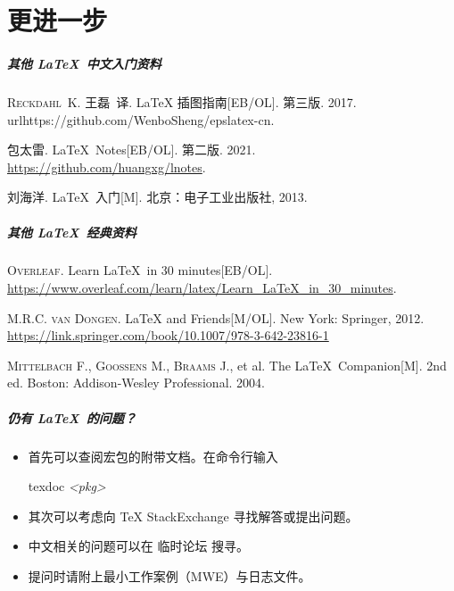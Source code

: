 
\part{更进一步}

\begin{frame}
  \frametitle{其他 \LaTeX\ 中文入门资料}
  \begin{bibliolist}{00}
    \onlineitem \textsc{Reckdahl~K.}
    王磊~译.
    \newblock \LaTeX{} 插图指南[EB/OL].
    \newblock 第三版. 2017. url{https://github.com/WenboSheng/epslatex-cn}.

    \onlineitem 包太雷.
    \newblock \LaTeX\ Notes[EB/OL].
    \newblock 第二版. 2021. \url{https://github.com/huangxg/lnotes}.

    \bookitem 刘海洋.
    \newblock \LaTeX\ 入门[M]. 
    \newblock 北京：电子工业出版社, 2013.
  \end{bibliolist}
\end{frame}

\begin{frame}
  \frametitle{其他 \LaTeX\ 经典资料}
  \begin{bibliolist}{00}
    \onlineitem \textsc{Overleaf}.
    \newblock Learn \LaTeX\ in 30 minutes[EB/OL]. 
    \newblock \url{https://www.overleaf.com/learn/latex/Learn_LaTeX_in_30_minutes}.

    \bookitem \textsc{M.R.C. van Dongen}.
    \newblock \LaTeX{} and Friends[M/OL].
    \newblock New York: Springer, 2012. 
    \url{https://link.springer.com/book/10.1007/978-3-642-23816-1}

    \bookitem \textsc{Mittelbach F.}, \textsc{Goossens M.}, \textsc{Braams J.}, et al.
    \newblock The \LaTeX\ Companion[M].
    \newblock 2nd ed. Boston: Addison-Wesley Professional. 2004.
  \end{bibliolist}
\end{frame}

\begin{frame}
  \frametitle{仍有 \LaTeX\ 的问题？}
  \begin{itemize}
    \item 首先可以查阅宏包的附带文档。在命令行输入
    
    \hfill
    \begin{minipage}{0.3\textwidth}
      \begin{exampleblock}{\faTerminal}
        \ttfamily
        texdoc \textit{<pkg>}
      \end{exampleblock}
    \end{minipage}
    \item 其次可以考虑向 \TeX{} StackExchange  寻找解答或提出问题。
    \item 中文相关的问题可以在 \CTeX{} 临时论坛  搜寻。
    \item 提问时请附上最小工作案例（MWE）与日志文件。
  \end{itemize}
\end{frame}

